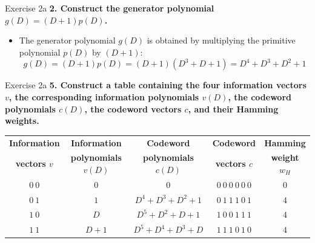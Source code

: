 \documentclass[10pt, aspectratio=169]{beamer}
\newcommand{\question}[1]{{\color{QuestionRed}\textbf{#1}}}
\begin{document}
\begin{frame}{Exercise 2a}
  \question{2. Construct the generator polynomial $g(D) = (D+1)p(D)$.}

  \vspace{0.3cm}
  \begin{itemize}
    \item The generator polynomial $g(D)$ is obtained by multiplying the primitive polynomial $p(D)$ by $(D+1)$:
    \[
      g(D) = (D+1)p(D) = (D+1)(D^3 + D + 1) = D^4 + D^3 + D^2 + 1
    \]
  \end{itemize}
\end{frame}

\begin{frame}{Exercise 2a}
  \question{5. Construct a table containing the four information vectors $v$, the corresponding information polynomials $v(D)$, the codeword polynomials $c(D)$, the codeword vectors $c$, and their Hamming weights.}

  \vspace{0.5cm}
  \centering
  \footnotesize
  \setlength{\tabcolsep}{4.5pt}
  \begin{tabular}{ccccc}
    \toprule
    \textbf{Information} & \textbf{Information} & \textbf{Codeword} & \textbf{Codeword} & \textbf{Hamming} \\
    \textbf{vectors $v$} & \textbf{polynomials $v(D)$} & \textbf{polynomials $c(D)$} & \textbf{vectors $c$} & \textbf{weight $w_H$} \\
    \midrule
    $0\ 0$ & $0$ & $0$ & $0\ 0\ 0\ 0\ 0\ 0$ & $0$ \\
    $0\ 1$ & $1$ & $D^4 + D^3 + D^2 + 1$ & $0\ 1\ 1\ 1\ 0\ 1$ & $4$ \\
    $1\ 0$ & $D$ & $D^5 + D^2 + D + 1$ & $1\ 0\ 0\ 1\ 1\ 1$ & $4$ \\
    $1\ 1$ & $D+1$ & $D^5 + D^4 + D^3 + D$ & $1\ 1\ 1\ 0\ 1\ 0$ & $4$ \\
    \bottomrule
  \end{tabular}
\end{frame}
\end{document}
